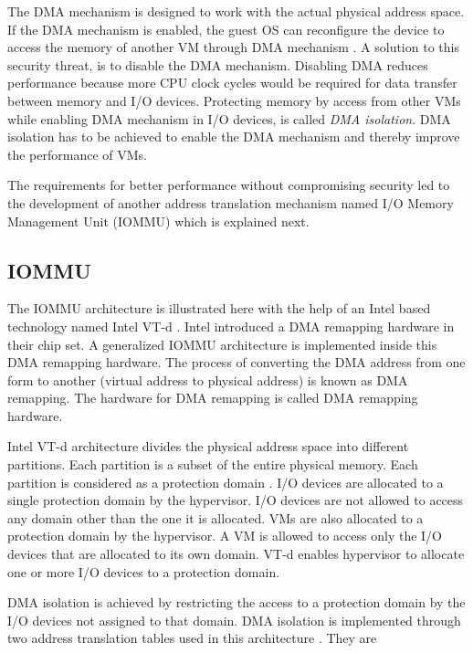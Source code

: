 \documentclass[a4paper,10pt,twocolumn]{article}
\begin{document}
  The DMA mechanism is designed to work with the actual physical address space. If the DMA mechanism is enabled, the guest OS can reconfigure the device to access the memory of another VM through DMA mechanism \cite{szefer2012architectural}. A solution to this security threat, is to disable the DMA mechanism. Disabling DMA reduces performance because more CPU clock cycles would be required for data transfer between memory and I/O devices. Protecting memory by access from other VMs while enabling DMA mechanism in I/O devices, is called \textit{DMA isolation}. DMA isolation has to be achieved to enable the DMA mechanism and thereby improve the performance of VMs.

  The requirements for better performance without compromising security led to the development of another address translation mechanism named I/O Memory Management Unit (IOMMU) \cite{ben2006utilizing} which is explained next.

  \subsection{IOMMU}

  The IOMMU architecture is illustrated here with the help of an Intel based technology named Intel VT-d \cite{vt-directed-io-spec}. Intel introduced a DMA remapping hardware in their chip set. A generalized IOMMU architecture is implemented inside this DMA remapping hardware. The process of converting the DMA address from one form to another (virtual address to physical address) is known as DMA remapping. The hardware for DMA remapping is called DMA remapping hardware.

  Intel VT-d architecture divides the physical address space into different partitions. Each partition is a subset of the entire physical memory. Each partition is considered as a protection domain \cite{vt-directed-io-spec} \cite{DarrenAbramson2006}. I/O devices are allocated to a single protection domain by the hypervisor. I/O devices are not allowed to access any domain other than the one it is allocated. VMs are also allocated to a protection domain by the hypervisor. A VM is allowed to access only the I/O devices that are allocated to its own domain. VT-d enables hypervisor to allocate one or more I/O devices to a protection domain.

  DMA isolation is achieved by restricting the access to a protection domain by the I/O devices not assigned to that domain. DMA isolation is implemented through two address translation tables used in this architecture \cite{vt-directed-io-spec} \cite{DarrenAbramson2006}. They are 
\end{document}
